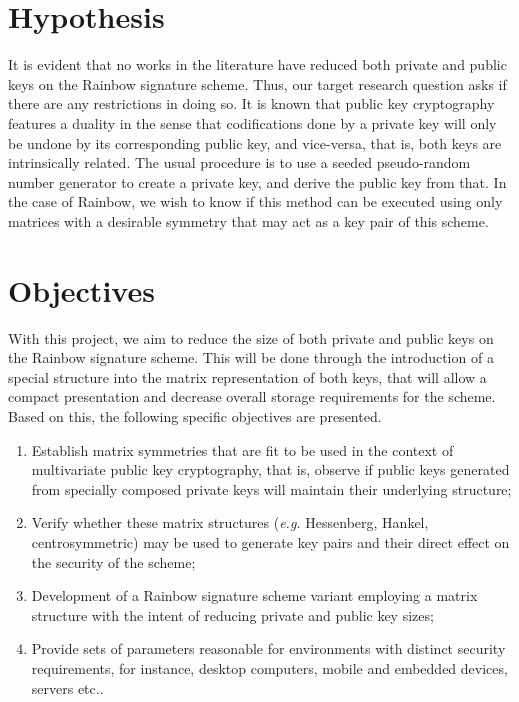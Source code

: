 \documentclass[10pt]{article}
\begin{document}
\section{Hypothesis}

It is evident that no works in the literature have reduced both private and public keys on the Rainbow signature scheme. Thus, our target research question asks if there are any restrictions in doing so. It is known that public key cryptography features a duality in the sense that codifications done by a private key will only be undone by its corresponding public key, and vice-versa, that is, both keys are intrinsically related. The usual procedure is to use a seeded pseudo-random number generator to create a private key, and derive the public key from that. In the case of Rainbow, we wish to know if this method can be executed using only matrices with a desirable symmetry that may act as a key pair of this scheme. 

\section{Objectives}

With this project, we aim to reduce the size of both private and public keys on the Rainbow signature scheme. This will be done through the introduction of a special structure into the matrix representation of both keys, that will allow a compact presentation and decrease overall storage requirements for the scheme. Based on this, the following specific objectives are presented.

\begin{enumerate}[label=\alph*.]
    \item Establish matrix symmetries that are fit to be used in the context of multivariate public key cryptography, that is, observe if public keys generated from specially composed private keys will maintain their underlying structure;
    \item Verify whether these matrix structures (\emph{e.g.} Hessenberg, Hankel, centrosymmetric) may be used to generate key pairs and their direct effect on the security of the scheme;
    \item Development of a Rainbow signature scheme variant employing a matrix structure with the intent of reducing private and public key sizes;
    \item Provide sets of parameters reasonable for environments with distinct security requirements, for instance, desktop computers, mobile and embedded devices, servers etc..
\end{enumerate}
\end{document}
